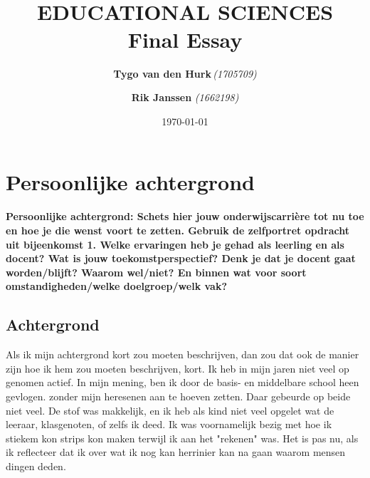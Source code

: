 \documentclass{article}
\title{ 
    \normalsize 
    \textsc{} \\
    [2.0cm]
    \HRule{1.5pt} \\
    \LARGE \textbf{
        \uppercase{Educational sciences}
        \HRule{2.0pt} \\ 
        [0.6cm] 
        \LARGE{Final Essay} 
        \vspace*{10\baselineskip}
    }
}
\date{\today}
\author{
    \textbf{Tygo van den Hurk}\,\orcidlink{0009-0003-4182-5076}\textit{(1705709)} \and
    \textbf{Rik Janssen} \textit{(1662198)}
}
\begin{document}
   

    
    \maketitle
    \thispagestyle{empty}
    \newpage
    
    
    \renewcommand{\contentsname}{Inhoudsopgave}
    \tableofcontents
    \thispagestyle{empty}
    \newpage


    \section{Persoonlijke achtergrond}
        \textbf{Persoonlijke achtergrond: Schets hier jouw onderwijscarrière tot nu toe en hoe je die wenst voort te zetten. Gebruik de zelfportret opdracht uit bijeenkomst 1. Welke ervaringen heb je gehad als leerling en als docent? Wat is jouw toekomstperspectief? Denk je dat je docent gaat worden/blijft? Waarom wel/niet? En binnen wat voor soort omstandigheden/welke doelgroep/welk vak?}
        
        \subsection{Achtergrond}
            Als ik mijn achtergrond kort zou moeten beschrijven, dan zou dat ook de manier zijn hoe ik hem zou moeten beschrijven, kort. Ik heb in mijn jaren niet veel op genomen actief. In mijn mening, ben ik door de basis- en middelbare school heen gevlogen. zonder mijn heresenen aan te hoeven zetten. Daar gebeurde op beide niet veel. De stof was makkelijk, en ik heb als kind niet veel opgelet wat de leeraar, klasgenoten, of zelfs ik deed. Ik was voornamelijk bezig met hoe ik stiekem kon strips kon maken terwijl ik aan het "rekenen" was. Het is pas nu, als ik reflecteer dat ik over wat ik nog kan herrinier kan na gaan waarom mensen dingen deden.
\end{document}
